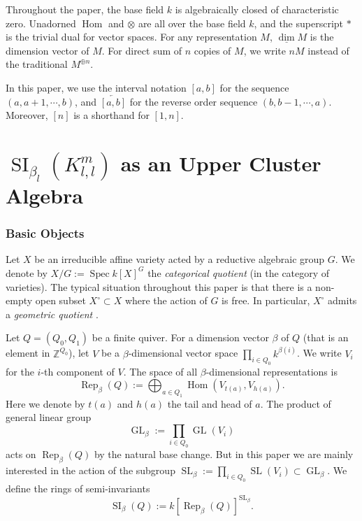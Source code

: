 \documentclass{amsart}
\theoremstyle{definition}
\theoremstyle{remark}
\numberwithin{equation}{section}
\DeclareMathOperator{\GL}{GL}
\DeclareMathOperator{\Hom}{Hom}
\DeclareMathOperator{\Mod}{Mod}
\DeclareMathOperator{\Rep}{Rep}
\DeclareMathOperator{\SI}{SI}
\DeclareMathOperator{\SL}{SL}
\DeclareMathOperator{\Spec}{Spec}
\newcommand{\mb}[1]{\mathbb{#1}}
\renewcommand{\b}[1]{\bold{#1}}
\newcommand{\dv}{\underline{\dim}}
\newcommand{\kllm}{{K_{l,l}^m}}
\newcommand{\zllm}{{Z_{l,l}^m}}
\newcommand{\bl}{{\beta_l}}
\begin{document}
Throughout the paper, the base field $k$ is algebraically closed of characteristic zero.
Unadorned $\Hom$ and $\otimes$ are all over the base field $k$, and the superscript $*$ is the trivial dual for vector spaces.
For any representation $M$, $\dv M$ is the dimension vector of $M$.
For direct sum of $n$ copies of $M$, we write $nM$ instead of the traditional $M^{\oplus n}$.

In this paper, we use the interval notation $[a,b]$ for the sequence $(a,a+1,\cdots,b)$,
and $\overleftarrow{[a,b]}$ for the reverse order sequence $(b,b-1,\cdots,a)$.
Moreover, $[n]$ is a shorthand for $[1,n]$.


\part{$\SI_\bl(\kllm)$ as an Upper Cluster Algebra} \label{P:I}
\section{Basic Objects} \label{S:Bobjs}

Let $X$ be an irreducible affine variety acted by a reductive algebraic group $G$.
We denote by $X/G:=\Spec k[X]^G$ the {\em categorical quotient} (in the category of varieties).
The typical situation throughout this paper is that there is a non-empty open subset $X^\circ\subset X$ where the action of $G$ is free. 
In particular, $X^\circ$ admits a {\em geometric quotient} \cite{PV}.
 
Let $Q=(Q_0,Q_1)$ be a finite quiver.
For a dimension vector $\beta$ of $Q$ (that is an element in $\mb{Z}^{Q_0}$), let $V$ be a $\beta$-dimensional vector space $\prod_{i\in Q_0} k^{\beta(i)}$. We write $V_i$ for the $i$-th component of $V$.
The space of all $\beta$-dimensional representations is
$$\Rep_\beta(Q):=\bigoplus_{a\in Q_1}\Hom(V_{t(a)},V_{h(a)}).$$
Here we denote by $t(a)$ and $h(a)$ the tail and head of $a$.
The product of general linear group
$$\GL_\beta:=\prod_{i\in Q_0}\GL(V_i)$$
acts on $\Rep_\beta(Q)$ by the natural base change.
But in this paper we are mainly interested in the action of the subgroup $\SL_\beta:=\prod_{i\in Q_0}\SL(V_i)\subset \GL_\beta$.
We define the rings of semi-invariants
$$\SI_\beta(Q):=k[\Rep_\beta(Q)]^{\SL_\beta}.$$
\end{document}
